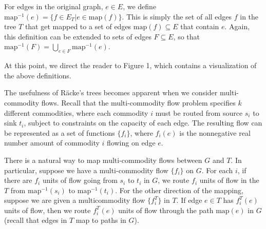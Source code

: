 \documentclass[12pt]{article}
\begin{document}
For edges in the original graph, $e \in E$, we define $\mathrm{map}^{-1}(e) = \{ f \in E_T | e \in \mathrm{map}(f)\}$. This is simply the set of all edges $f$ in the tree $T$ that get mapped to a set of edges $\mathrm{map}(f) \subseteq E$ that contain $e$. Again, this definition can be extended to sets of edges $F \subseteq E$, so that $\mathrm{map}^{-1}(F) = \bigcup_{e \in F} \mathrm{map}^{-1}(e)$.

At this point, we direct the reader to Figure 1, which contains a visualization of the above definitions.

The usefulness of R\"{a}cke's trees becomes apparent when we consider multi-commodity flows. Recall that the multi-commodity flow problem specifies $k$ different commodities, where each commodity $i$ must be routed from source $s_i$ to sink $t_i$, subject to constraints on the capacity of each edge. The resulting flow can be represented as a set of functions $\{ f_i \}$, where $f_i(e)$ is the nonnegative real number amount of commodity $i$ flowing on edge $e$. 

There is a natural way to map multi-commodity flows between $G$ and $T$. In particular, suppose we have a multi-commodity flow $\{ f_i \}$ on $G$. For each $i$, if there are $f_i$ units of flow going from $s_i$ to $t_i$ in $G$, we route $f_i$ units of flow in the $T$ from $\mathrm{map}^{-1}(s_i)$ to $\mathrm{map}^{-1}(t_i)$. For the other direction of the mapping, suppose we are given a multicommodity flow $\{ f_i^T \}$ in $T$. If edge $e \in T$ has $f_i^T(e)$ units of flow, then we route $f_i^T(e)$ units of flow through the path $\mathrm{map}(e)$ in $G$ (recall that edges in $T$ map to paths in $G$).
\end{document}
